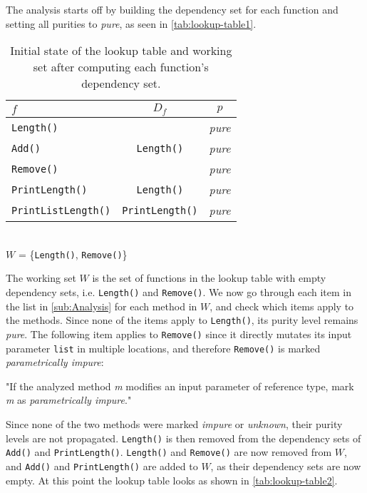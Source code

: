 \documentclass[a4paper,12pt]{article}
\begin{document}
The analysis starts off by building the dependency set for each function and setting all purities to \textit{pure}, as seen in \autoref{tab:lookup-table1}.

\begin{table}[H]
  \caption{Initial state of the lookup table and working set after computing each function's dependency set.}
  \label{tab:lookup-table1}
  \centering
  \begin{tabular}{|l|c|c|}
    \hline
    $f$                         & $D_f$                  & $p$    \\ \hline
    \texttt{Length()}           &                        & \textit{pure} \\
    \texttt{Add()}              & \texttt{Length()}      & \textit{pure} \\
    \texttt{Remove()}           &                        & \textit{pure} \\
    \texttt{PrintLength()}      & \texttt{Length()}      & \textit{pure} \\
    \texttt{PrintListLength()}  & \texttt{PrintLength()} & \textit{pure} \\ \hline
  \end{tabular}
  \\
  $W$ = \{\texttt{Length()}, \texttt{Remove()}\}
\end{table}

The working set $W$ is the set of functions in the lookup table with empty dependency sets, i.e. \texttt{Length()} and \texttt{Remove()}. We now go through each item in the list in \autoref{sub:Analysis} for each method in $W$, and check which items apply to the methods. Since none of the items apply to \texttt{Length()}, its purity level remains \textit{pure}. The following item applies to \texttt{Remove()} since it directly mutates its input parameter \texttt{list} in multiple locations, and therefore \texttt{Remove()} is marked \textit{parametrically impure}:

"If the analyzed method \textit{m} modifies an input parameter of reference type, mark \textit{m} as \textit{parametrically impure}."

Since none of the two methods were marked \textit{impure} or \textit{unknown}, their purity levels are not propagated. \texttt{Length()} is then removed from the dependency sets of \texttt{Add()} and \texttt{PrintLength()}. \texttt{Length()} and \texttt{Remove()} are now removed from $W$, and \texttt{Add()} and \texttt{PrintLength()} are added to $W$, as their dependency sets are now empty. At this point the lookup table looks as shown in \autoref{tab:lookup-table2}.
\end{document}
